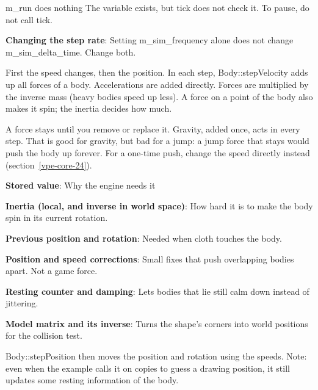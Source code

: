 \documentclass[11pt,a4paper]{article}
\begin{document}
m\_run does nothing                       The variable exists, but tick does not check it. To pause, do not call tick.

\textbf{Changing the step rate}: Setting m\_sim\_frequency alone does not change m\_sim\_delta\_time. Change both.

\label{vpe-core-12}
First the speed changes, then the position. In each step, Body::stepVelocity adds up all forces of a body. Accelerations are added directly. Forces are multiplied by the inverse mass (heavy bodies speed up less). A force on a point of the body also makes it spin; the inertia decides how much.

\begin{center}\end{center}

A force stays until you remove or replace it. Gravity, added once, acts in every step. That is good for gravity, but bad for a jump: a jump force that stays would push the body up forever. For a one-time push, change the speed directly instead (section~\ref{vpe-core-24}).

\textbf{Stored value}: Why the engine needs it

\textbf{Inertia (local, and inverse in world space)}: How hard it is to make the body spin in its current rotation.

\textbf{Previous position and rotation}: Needed when cloth touches the body.

\textbf{Position and speed corrections}: Small fixes that push overlapping bodies apart. Not a game force.

\textbf{Resting counter and damping}: Lets bodies that lie still calm down instead of jittering.

\textbf{Model matrix and its inverse}: Turns the shape's corners into world positions for the collision test.

Body::stepPosition then moves the position and rotation using the speeds. Note: even when the example calls it on copies to guess a drawing position, it still updates some resting information of the body.
\end{document}
